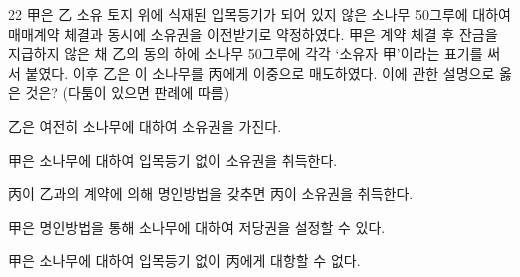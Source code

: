 \begin{question}{22}
甲은 乙 소유 토지 위에 식재된 입목등기가 되어 있지 않은 소나무 50그루에 대하여 매매계약 체결과 동시에 소유권을 이전받기로 약정하였다. 甲은 계약 체결 후 잔금을 지급하지 않은 채 乙의 동의 하에 소나무 50그루에 각각 ‘소유자 甲’이라는 표기를 써서 붙였다. 이후 乙은 이 소나무를 丙에게 이중으로 매도하였다. 이에 관한 설명으로 옳은 것은? (다툼이 있으면 판례에 따름)
\begin{choices}
  \item 乙은 여전히 소나무에 대하여 소유권을 가진다.
  \item 甲은 소나무에 대하여 입목등기 없이 소유권을 취득한다.
  \item 丙이 乙과의 계약에 의해 명인방법을 갖추면 丙이 소유권을 취득한다.
  \item 甲은 명인방법을 통해 소나무에 대하여 저당권을 설정할 수 있다.
  \item 甲은 소나무에 대하여 입목등기 없이 丙에게 대항할 수 없다.
\end{choices}
\end{question}
